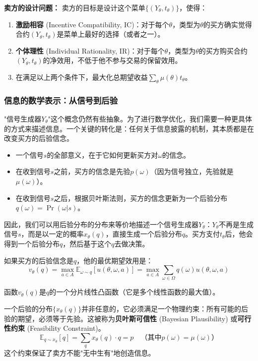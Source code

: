 \textbf{卖方的设计问题：}
卖方的目标是设计这个菜单$\{(Y_\theta,t_\theta)\}$，使得：

\begin{enumerate}
    \item \textbf{激励相容} (Incentive Compatibility, IC)：对于每个$\theta$，类型为$\theta$的买方确实觉得合约$(Y_\theta,t_\theta)$是菜单上最好的选择（或者之一）。
    \item \textbf{个体理性} (Individual Rationality, IR)：对于每个$\theta$，类型为$\theta$的买方购买合约$(Y_\theta,t_\theta)$的净效用，不低于他不参与交易的保留效用。
    \item 在满足以上两个条件下，最大化总期望收益$\sum\limits_{\theta}\mu(\theta)t_\theta$。
\end{enumerate}

\subsubsection{信息的数学表示：从信号到后验}

"信号生成器$Y_\theta$"这个概念仍然有些抽象。为了进行数学优化，我们需要一种更具体的方式来描述信息。一个关键的转化是：任何关于信息披露的机制，其本质都是在改变买方的后验信念。

\begin{itemize}
    \item 一个信号$s$的全部意义，在于它如何更新买方对$\omega$的信念。
    \item 在收到信号$s$之前，买方的信念是先验$p(\omega)$（因为信号独立，先验就是$\mu(\omega)$）。
    \item 在收到信号$s$之后，根据贝叶斯法则，买方的信念更新为一个后验分布$q(\omega)=\Pr(\omega|s)$。
\end{itemize}

因此，我们可以用后验分布的分布来等价地描述一个信号生成器$Y_\theta$：$Y_\theta$不再是生成信号$s$，而是以一定的概率$x_\theta(q)$，直接生成一个后验分布$q$。买方支付$t_\theta$后，他会得到一个后验分布$q$，然后基于这个$q$去做决策。

如果买方的后验信念是$q$，他的最优期望效用是：
$$v_\theta(q)=\max_{a\in A}\mathbb{E}_{\omega\sim q}[u(\theta,\omega,a)]=\max_{a\in A}\sum\limits_{\omega\in\Omega}q(\omega)u(\theta,\omega,a)$$

函数$v_\theta(q)$是$q$的一个分片线性凸函数（它是多个线性函数的最大值）。

一个后验的分布$\{x_\theta(q)\}$并非任意的，它必须满足一个物理约束：所有可能的后验的期望，必须等于先验。这被称为\textbf{贝叶斯可信性} (Bayesian Plausibility) 或\textbf{可行性约束} (Feasibility Constraint)。
$$\mathbb{E}_{q\sim x_\theta}[q]=\sum\limits_{q}x_\theta(q)\cdot q = p \quad \text{（其中}p(\omega)=\mu(\omega)\text{）}$$
这个约束保证了卖方不能"无中生有"地创造信息。

